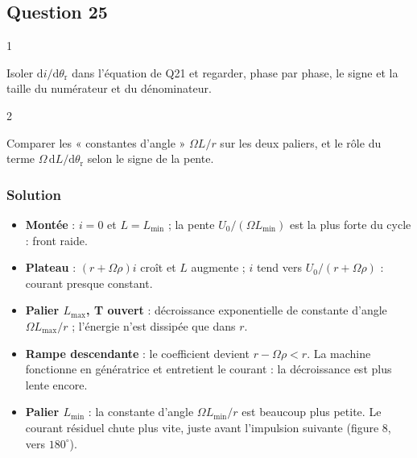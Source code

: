 \documentclass[11pt,a4paper]{article}
\providecommand{\tightlist}{\setlength{\itemsep}{0pt}\setlength{\parskip}{0pt}}
\newcommand{\equationajustee}[1]{%
  \sbox{\boiteequation}{$\displaystyle #1$}%
  \ifdim\wd\boiteequation>\linewidth
    \[\resizebox{\linewidth}{!}{\usebox{\boiteequation}}\]%
  \else
    \[#1\]%
  \fi}
\begin{document}
\hypertarget{question-25}{%
\subsection{Question 25}\label{question-25}}

\begin{indication}{1}

Isoler \(\mathrm di/\mathrm d\theta_{\mathrm r}\) dans l'équation de Q21 et regarder, phase par phase, le signe et la taille du numérateur et du dénominateur.

\end{indication}

\begin{indication}{2}

Comparer les « constantes d'angle » \(\Omega L/r\) sur les deux paliers, et le rôle du terme \(\Omega\,\mathrm dL/\mathrm d\theta_{\mathrm r}\) selon le signe de la pente.

\end{indication}

\hypertarget{solution-24}{%
\subsubsection{Solution}\label{solution-24}}

\equationajustee{\frac{\mathrm di}{\mathrm d\theta_{\mathrm r}}=\frac{u-(r+\Omega\,\mathrm dL/\mathrm d\theta_{\mathrm r})\,i}{\Omega L}}

\begin{itemize}
\tightlist
\item
  \textbf{Montée} : \(i=0\) et \(L=L_{\min}\) ; la pente \(U_0/(\Omega L_{\min})\) est la plus forte du cycle : front raide.
\item
  \textbf{Plateau} : \((r+\Omega\rho)i\) croît et \(L\) augmente ; \(i\) tend vers \(U_0/(r+\Omega\rho)\) : courant presque constant.
\item
  \textbf{Palier \(L_{\max}\), T ouvert} : décroissance exponentielle de constante d'angle \(\Omega L_{\max}/r\) ; l'énergie n'est dissipée que dans \(r\).
\item
  \textbf{Rampe descendante} : le coefficient devient \(r-\Omega\rho<r\). La machine fonctionne en génératrice et entretient le courant : la décroissance est plus lente encore.
\item
  \textbf{Palier \(L_{\min}\)} : la constante d'angle \(\Omega L_{\min}/r\) est beaucoup plus petite. Le courant résiduel chute plus vite, juste avant l'impulsion suivante (figure 8, vers \(180^\circ\)).
\end{itemize}
\end{document}
